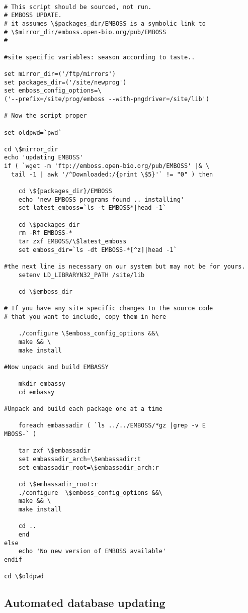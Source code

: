 \documentclass{report}
\begin{document}
\begin{verbatim}

# This script should be sourced, not run.
# EMBOSS UPDATE.
# it assumes \$packages_dir/EMBOSS is a symbolic link to 
# \$mirror_dir/emboss.open-bio.org/pub/EMBOSS
#

#site specific variables: season according to taste..

set mirror_dir=('/ftp/mirrors')
set packages_dir=('/site/newprog')
set emboss_config_options=\
('--prefix=/site/prog/emboss --with-pngdriver=/site/lib')

# Now the script proper

set oldpwd=`pwd`

cd \$mirror_dir
echo 'updating EMBOSS'
if ( `wget -m 'ftp://emboss.open-bio.org/pub/EMBOSS' |& \
  tail -1 | awk '/^Downloaded:/{print \$5}'` != "0" ) then 

    cd \${packages_dir}/EMBOSS
    echo 'new EMBOSS programs found .. installing'
    set latest_emboss=`ls -t EMBOSS*|head -1`

    cd \$packages_dir
    rm -Rf EMBOSS-*
    tar zxf EMBOSS/\$latest_emboss
    set emboss_dir=`ls -dt EMBOSS-*[^z]|head -1`

#the next line is necessary on our system but may not be for yours.
    setenv LD_LIBRARYN32_PATH /site/lib

    cd \$emboss_dir

# If you have any site specific changes to the source code 
# that you want to include, copy them in here

    ./configure \$emboss_config_options &&\
    make && \
    make install

#Now unpack and build EMBASSY

    mkdir embassy
    cd embassy

#Unpack and build each package one at a time

    foreach embassadir ( `ls ../../EMBOSS/*gz |grep -v E
MBOSS-` )

	tar zxf \$embassadir
	set embassadir_arch=\$embassadir:t
	set embassadir_root=\$embassadir_arch:r

	cd \$embassadir_root:r
	./configure  \$emboss_config_options &&\
	make && \
	make install

	cd ..
    end
else
    echo 'No new version of EMBOSS available'
endif

cd \$oldpwd
\end{verbatim} 

\subsection{Automated database updating}
\end{document}
